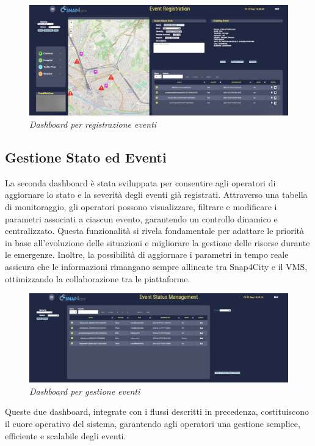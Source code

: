 \documentclass[a4paper, openright, thesis]{report}
\begin{document}
\begin{figure}[H]
    \centering
    \includegraphics[width=1\linewidth]{img/EventRegistration.png}
    \caption{\textit{ Dashboard per registrazione eventi}}
    \label{16}
\end{figure}


\subsection{Gestione Stato ed Eventi}  

La seconda dashboard è stata sviluppata per consentire agli operatori di aggiornare lo stato e la severità degli eventi già registrati. Attraverso una tabella di monitoraggio, gli operatori possono visualizzare, filtrare e modificare i parametri associati a ciascun evento, garantendo un controllo dinamico e centralizzato. 
Questa funzionalità si rivela fondamentale per adattare le priorità in base all’evoluzione delle situazioni e migliorare la gestione delle risorse durante le emergenze. Inoltre, la possibilità di aggiornare i parametri in tempo reale assicura che le informazioni rimangano sempre allineate tra Snap4City e il VMS, ottimizzando la collaborazione tra le piattaforme.
\begin{figure}[H]
    \centering
    \includegraphics[width=1\linewidth]{img/EventStatus.png}
    \caption{\textit{ Dashboard per gestione eventi}}
    \label{17}
\end{figure}
\noindent
Queste due dashboard, integrate con i flussi descritti in precedenza, costituiscono il cuore operativo del sistema, garantendo agli operatori una gestione semplice, efficiente e scalabile degli eventi.  
\end{document}
